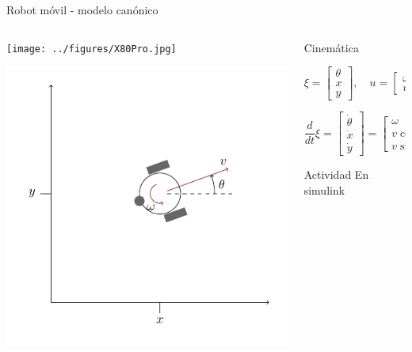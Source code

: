 \documentclass[presentation,aspectratio=169]{beamer}
\begin{document}
\begin{frame}[label={sec:org9105af5}]{Robot móvil - modelo canónico}
\begin{columns}
\begin{column}{0.4\columnwidth}
\begin{center}
 \texttt{[image: ../figures/X80Pro.jpg]}
\end{center}
\begin{center}
 \includegraphics[width=1.0\linewidth]{../figures/unicycle-model}
\end{center}
\end{column}

\begin{column}{0.6\columnwidth}
\pause

\alert{Cinemática}

\[ \xi = \begin{bmatrix} \theta\\x\\y \end{bmatrix},   \quad u = \begin{bmatrix} \omega\\v \end{bmatrix}\]



\[\frac{d}{dt} \xi = \begin{bmatrix} \dot{\theta}\\\dot{x}\\\dot{y} \end{bmatrix} = \begin{bmatrix} \omega\\ v\cos\theta\\v\sin\theta\end{bmatrix} \]


\pause

\alert{Actividad} En simulink
\end{column}
\end{columns}
\end{frame}
\end{document}

